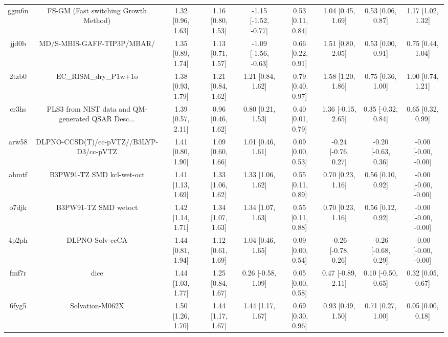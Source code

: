 \documentclass{article}
\begin{document}
\begin{center}
\begin{longtable}{|ccccccccc|}
 ggm6n &               FS-GM (Fast switching Growth Method) &  1.32 [0.96, 1.63] &  1.16 [0.80, 1.53] &  -1.15 [-1.52, -0.77] &  0.53 [0.11, 0.84] &    1.04 [0.45, 1.69] &    0.53 [0.06, 0.87] &     1.17 [1.02, 1.32] \\
 jjd0b &                         MD/S-MBIS-GAFF-TIP3P/MBAR/ &  1.35 [0.89, 1.74] &  1.13 [0.71, 1.57] &  -1.09 [-1.56, -0.63] &  0.66 [0.22, 0.91] &    1.51 [0.80, 2.05] &    0.53 [0.00, 0.91] &     0.75 [0.44, 1.04] \\
 2tzb0 &                              EC\_RISM\_dry\_P1w+1o &  1.38 [0.93, 1.79] &  1.21 [0.84, 1.62] &     1.21 [0.84, 1.62] &  0.79 [0.40, 0.97] &    1.58 [1.20, 1.86] &    0.75 [0.36, 1.00] &     1.00 [0.74, 1.21] \\
 cr3hs &  PLS3 from NIST data and QM-generated QSAR Desc... &  1.39 [0.57, 2.11] &  0.96 [0.46, 1.62] &     0.80 [0.21, 1.53] &  0.40 [0.01, 0.79] &   1.36 [-0.15, 2.65] &   0.35 [-0.32, 0.84] &     0.65 [0.32, 0.99] \\
 arw58 &            DLPNO-CCSD(T)/cc-pVTZ//B3LYP-D3/cc-pVTZ &  1.41 [0.80, 1.90] &  1.09 [0.60, 1.66] &     1.01 [0.46, 1.61] &  0.09 [0.00, 0.53] &  -0.24 [-0.76, 0.27] &  -0.20 [-0.63, 0.36] &  -0.00 [-0.00, -0.00] \\
 ahmtf &                          B3PW91-TZ SMD kcl-wet-oct &  1.41 [1.13, 1.69] &  1.33 [1.06, 1.62] &     1.33 [1.06, 1.62] &  0.55 [0.11, 0.89] &    0.70 [0.23, 1.16] &    0.56 [0.10, 0.92] &  -0.00 [-0.00, -0.00] \\
 o7djk &                               B3PW91-TZ SMD wetoct &  1.42 [1.14, 1.71] &  1.34 [1.07, 1.63] &     1.34 [1.07, 1.63] &  0.55 [0.11, 0.88] &    0.70 [0.23, 1.16] &    0.56 [0.12, 0.92] &  -0.00 [-0.00, -0.00] \\
 4p2ph &                                    DLPNO-Solv-ccCA &  1.44 [0.81, 1.94] &  1.12 [0.61, 1.69] &     1.04 [0.46, 1.65] &  0.09 [0.00, 0.54] &  -0.26 [-0.78, 0.26] &  -0.26 [-0.68, 0.29] &  -0.00 [-0.00, -0.00] \\
 fmf7r &                                               dice &  1.44 [1.03, 1.77] &  1.25 [0.84, 1.67] &    0.26 [-0.58, 1.09] &  0.05 [0.00, 0.58] &   0.47 [-0.89, 2.11] &   0.10 [-0.50, 0.65] &     0.32 [0.05, 0.67] \\
 6fyg5 &                                    Solvation-M062X &  1.50 [1.26, 1.70] &  1.44 [1.17, 1.67] &     1.44 [1.17, 1.67] &  0.69 [0.30, 0.96] &    0.93 [0.49, 1.50] &    0.71 [0.27, 1.00] &     0.05 [0.00, 0.18] \\

\end{longtable}
\end{center}
\end{document}
